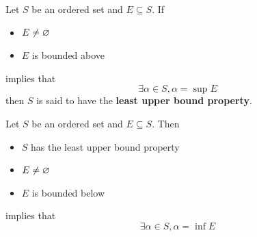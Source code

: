 \bigskip

\begin{definition} \label{an:def:least-upper-bound-property}
    Let $S$ be an ordered set and $E \subseteq S$. If
    \begin{itemize}
        \item $E \neq \varnothing$
        \item $E$ is bounded above
    \end{itemize}
    implies that
    \[
    \exists \alpha \in S, \alpha = \sup E
    \]
    then $S$ is said to have the \textbf{least upper bound property}.
\end{definition}

\bigskip

\begin{theorem} \label{an:thm:greatest-lower-bound-property}
    Let $S$ be an ordered set and $E \subseteq S$. Then
    \begin{itemize}
        \item $S$ has the least upper bound property
        \item $E \neq \varnothing$
        \item $E$ is bounded below
    \end{itemize}
    implies that
    \[
    \exists \alpha \in S, \alpha = \inf E
    \]
\end{theorem}

